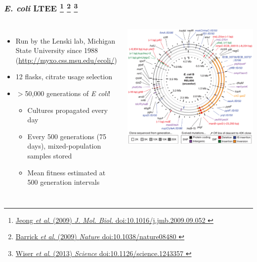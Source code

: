 
%
\begin{frame}
  \frametitle{\textit{E. coli} LTEE
                   \footnote{\tiny{\href{http://dx.doi.org/10.1016/j.jmb.2009.09.052
}{Jeong \textit{et al}. (2009) \textit{J. Mol. Biol.} doi:10.1016/j.jmb.2009.09.052
}}}
                   \footnote{\tiny{\href{http://dx.doi.org/10.1038/nature08480
}{Barrick \textit{et al}. (2009) \textit{Nature} doi:10.1038/nature08480
}}}
                   \footnote{\tiny{\href{http://dx.doi.org/10.1126/science.1243357
}{Wiser \textit{et al}. (2013) \textit{Science} doi:10.1126/science.1243357
}}}}
    \begin{columns}[c] 
        \begin{itemize}
          \item \textcolor{RawSienna}{Run by the Lenski lab, Michigan State University since 1988 \\
          (\href{http://myxo.css.msu.edu/ecoli/}{http://myxo.css.msu.edu/ecoli/})}
          \item \textcolor{hutton_green}{12 flasks, citrate usage selection}
          \item \textcolor{hutton_blue}{$>$50,000 generations of \textit{E coli}!}
          \begin{itemize}
            \item Cultures propagated every day
            \item Every 500 generations (75 days), mixed-population samples stored
            \item Mean fitness estimated at 500 generation intervals
          \end{itemize}
        \end{itemize}
        \includegraphics[width=\textwidth]{images/ltee_circular} \\

\end{columns}
\end{frame}
